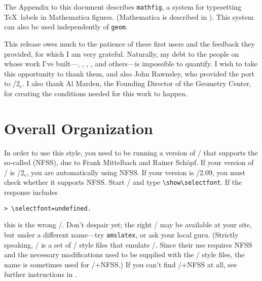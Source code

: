 The Appendix to this document describes \verb+mathfig+, a system for
typesetting \TeX\ labels in Mathematica figures. (Mathematica is
described in \cite{wolfram}).  This system can also be used
independently of \verb+geom+.

This release owes much to the patience of these first users and the
feedback they provided, for which I am very grateful.  Naturally, my
debt to the people on whose work I've built---,
, , ,
 and others---is impossible to quantify. I wish to
take this opportunity to thank them, and also John Rawnsley, who
provided the port to \latex/2$_\epsilon$.  I also thank Al Marden, the
Founding Director of the Geometry Center, for creating the conditions
needed for this work to happen.

\section{Overall Organization}

In order to use this style, you need to be running a version of
\latex/ that supports the so-called  (NFSS), due to Frank Mittelbach and Rainer Sch\"opf.
If your version of \latex/ is \latex/2$_\epsilon$, you are
automatically using NFSS.  If your version is \latex/2.09, you must
check whether it supports NFSS. Start \latex/ and type
\verb+\show\selectfont+.  If the response includes
%
\begin{verbatim}
> \selectfont=undefined.
\end{verbatim}
%
this is the wrong \latex/.  Don't despair yet; 
the right \latex/ may be available at your
site, but under a different name---try \verb+amslatex+,
or ask your local guru. (Strictly speaking, \amslatex/
\cite{amslatex} is a set of \latex/ style files that emulate \amstex/.
Since their use requires NFSS and the
necessary modifications used to be supplied with the \amslatex/ style files,
the name is sometimes used for \latex/+NFSS.)  If you can't find
\latex/+NFSS at all, see further instructions in .

